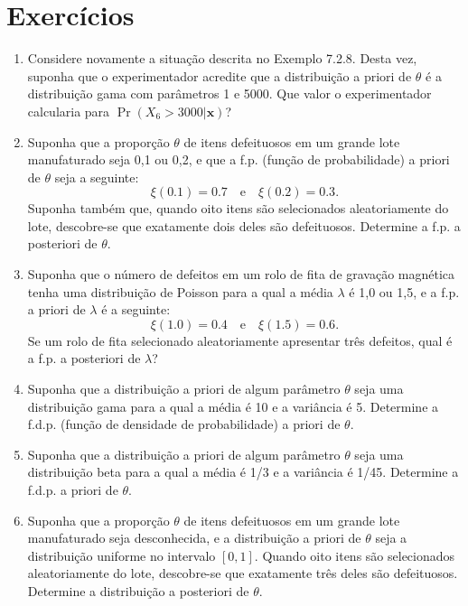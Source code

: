 \section*{Exercícios}
\begin{enumerate}
    \item Considere novamente a situação descrita no Exemplo 7.2.8. Desta vez, suponha que o experimentador acredite que a distribuição a priori de $\theta$ é a distribuição gama com parâmetros 1 e 5000. Que valor o experimentador calcularia para $\Pr(X_6 > 3000|\mathbf{x})$?

    \item Suponha que a proporção $\theta$ de itens defeituosos em um grande lote manufaturado seja 0,1 ou 0,2, e que a f.p. (função de probabilidade) a priori de $\theta$ seja a seguinte:
    $$ \xi(0.1) = 0.7 \quad \text{e} \quad \xi(0.2) = 0.3. $$
    Suponha também que, quando oito itens são selecionados aleatoriamente do lote, descobre-se que exatamente dois deles são defeituosos. Determine a f.p. a posteriori de $\theta$.

    \item Suponha que o número de defeitos em um rolo de fita de gravação magnética tenha uma distribuição de Poisson para a qual a média $\lambda$ é 1,0 ou 1,5, e a f.p. a priori de $\lambda$ é a seguinte:
    $$ \xi(1.0) = 0.4 \quad \text{e} \quad \xi(1.5) = 0.6. $$
    Se um rolo de fita selecionado aleatoriamente apresentar três defeitos, qual é a f.p. a posteriori de $\lambda$?

    \item Suponha que a distribuição a priori de algum parâmetro $\theta$ seja uma distribuição gama para a qual a média é 10 e a variância é 5. Determine a f.d.p. (função de densidade de probabilidade) a priori de $\theta$.

    \item Suponha que a distribuição a priori de algum parâmetro $\theta$ seja uma distribuição beta para a qual a média é 1/3 e a variância é 1/45. Determine a f.d.p. a priori de $\theta$.

    \item Suponha que a proporção $\theta$ de itens defeituosos em um grande lote manufaturado seja desconhecida, e a distribuição a priori de $\theta$ seja a distribuição uniforme no intervalo $[0, 1]$. Quando oito itens são selecionados aleatoriamente do lote, descobre-se que exatamente três deles são defeituosos. Determine a distribuição a posteriori de $\theta$.


\end{enumerate}

